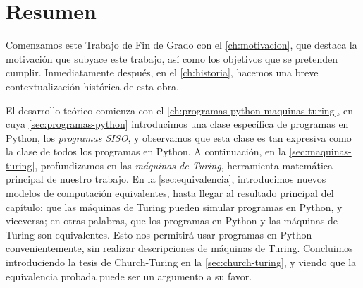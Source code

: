 %

\chapter{Resumen}



Comenzamos este Trabajo de Fin de Grado con el \cref{ch:motivacion}, que destaca la motivación que subyace este trabajo, así como los objetivos que se pretenden cumplir. Inmediatamente después, en el \cref{ch:historia}, hacemos una breve contextualización histórica de esta obra.

El desarrollo teórico comienza con el \cref{ch:programas-python-maquinas-turing}, en cuya \cref{sec:programas-python} introducimos una clase específica de programas en Python, los \emph{programas SISO}, y observamos que esta clase es tan expresiva como la clase de todos los programas en Python. A continuación, en la \cref{sec:maquinas-turing}, profundizamos en las \emph{máquinas de Turing}, herramienta matemática principal de nuestro trabajo. En la \cref{sec:equivalencia}, introducimos nuevos modelos de computación equivalentes, hasta llegar al resultado principal del capítulo: que las máquinas de Turing pueden simular programas en Python, y viceversa; en otras palabras, que los programas en Python y las máquinas de Turing son equivalentes. Esto nos permitirá usar programas en Python convenientemente, sin realizar descripciones de máquinas de Turing. Concluimos introduciendo la tesis de Church-Turing en la \cref{sec:church-turing}, y viendo que la equivalencia probada puede ser un argumento a su favor.

